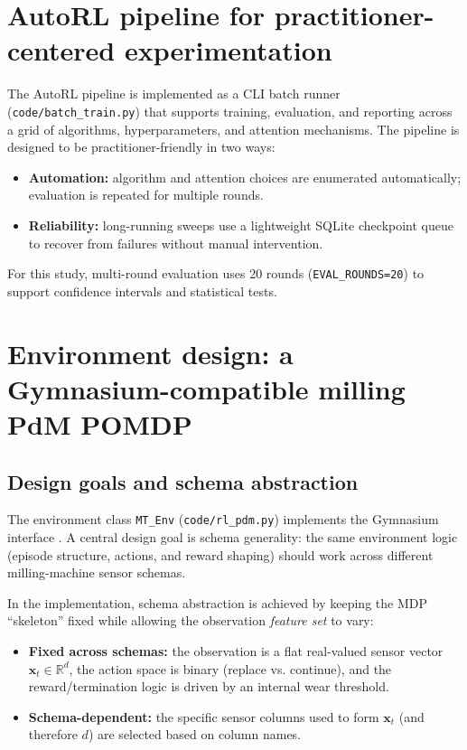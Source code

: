 \documentclass[refree,sn-basic]{sn-jnl} %
\begin{document}
\section{AutoRL pipeline for practitioner-centered experimentation}
\label{sec:autorl}
The AutoRL pipeline is implemented as a CLI batch runner (\texttt{code/batch\_train.py}) that supports training, evaluation, and reporting across a grid of algorithms, hyperparameters, and attention mechanisms. The pipeline is designed to be practitioner-friendly in two ways:
\begin{itemize}
        \item \textbf{Automation:} algorithm and attention choices are enumerated automatically; evaluation is repeated for multiple rounds.
        \item \textbf{Reliability:} long-running sweeps use a lightweight SQLite checkpoint queue to recover from failures without manual intervention.
\end{itemize}
For this study, multi-round evaluation uses 20 rounds (\texttt{EVAL\_ROUNDS=20}) to support confidence intervals and statistical tests.

\section{Environment design: a Gymnasium-compatible milling PdM POMDP}
\label{sec:env}
\subsection{Design goals and schema abstraction}
The environment class \texttt{MT\_Env} (\texttt{code/rl\_pdm.py}) implements the Gymnasium interface \cite{Foundation2023}. A central design goal is schema generality: the same environment logic (episode structure, actions, and reward shaping) should work across different milling-machine sensor schemas.

In the implementation, schema abstraction is achieved by keeping the MDP ``skeleton'' fixed while allowing the observation \emph{feature set} to vary:
\begin{itemize}
        \item \textbf{Fixed across schemas:} the observation is a flat real-valued sensor vector $\mathbf{x}_t\in\mathbb{R}^d$, the action space is binary (replace vs. continue), and the reward/termination logic is driven by an internal wear threshold.
        \item \textbf{Schema-dependent:} the specific sensor columns used to form $\mathbf{x}_t$ (and therefore $d$) are selected based on column names.
\end{itemize}
\end{document}

